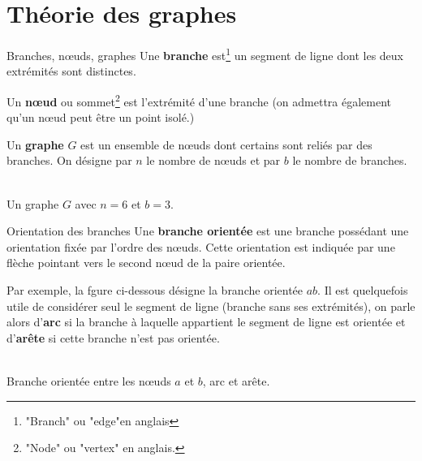 \section{Théorie des graphes}
\begin{frame}{Branches, n{\oe}uds, graphes}
Une \textbf{branche} est\footnote{"Branch" ou "edge"en anglais} un segment de ligne dont les deux extrémités sont distinctes.

Un \textbf{n{\oe}ud} ou sommet\footnote{"Node" ou "vertex" en anglais.} est l'extrémité d'une branche (on admettra également qu'un n{\oe}ud peut être un point isolé.)

Un \textbf{graphe} $G$ est un ensemble de n{\oe}uds dont
certains sont reliés par des branches. On désigne par $n$ le nombre
de n{\oe}uds et par $b$ le nombre de branches.
\begin{center}
	 \\ 
	Un graphe $G$ avec $n=6$ et $b=3$.
\end{center}

\end{frame} \begin{frame}{Orientation des branches}
Une \textbf{branche orientée} est une branche possédant une orientation fixée par
l'ordre des n{\oe}uds. Cette orientation est indiquée par une flèche pointant vers le second n{\oe}ud de la paire orientée. 

Par exemple, la fgure ci-dessous désigne la branche orientée $ab$.
Il est quelquefois utile de considérer seul le segment de ligne (branche sans ses extrémités), 
on parle alors d'\textbf{arc} si la branche à laquelle appartient le segment de ligne est orientée et d'\textbf{arête} si cette branche n'est pas orientée.
\begin{center}
	 \\
	{Branche orientée entre les n{\oe}uds $a$ et $b$, arc et arête.}
\end{center}


\end{frame}
